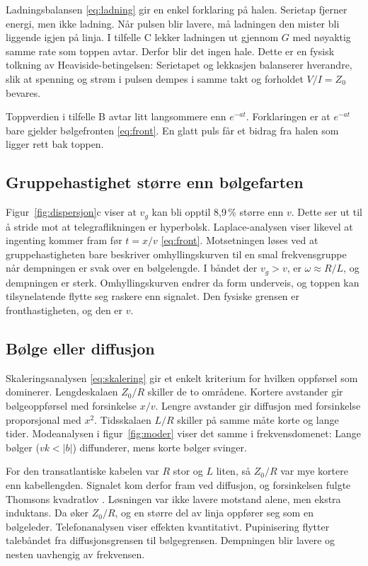 \documentclass[11pt,a4paper]{article}
\numberwithin{equation}{section}
\numberwithin{figure}{section}
\numberwithin{table}{section}
\begin{document}
Ladningsbalansen \eqref{eq:ladning} gir en enkel forklaring på halen. Serietap
fjerner energi, men ikke ladning. Når pulsen blir lavere, må ladningen den mister
bli liggende igjen på linja. I tilfelle C lekker ladningen ut gjennom $G$ med
nøyaktig samme rate som toppen avtar. Derfor blir det ingen hale. Dette er en
fysisk tolkning av Heaviside-betingelsen: Serietapet og lekkasjen balanserer
hverandre, slik at spenning og strøm i pulsen dempes i samme takt og forholdet
$V/I = Z_0$ bevares.

Toppverdien i tilfelle B avtar litt langsommere enn $e^{-at}$. Forklaringen er
at $e^{-at}$ bare gjelder bølgefronten \eqref{eq:front}. En glatt puls får et
bidrag fra halen som ligger rett bak toppen.

\subsection{Gruppehastighet større enn bølgefarten}
Figur~\ref{fig:dispersjon}c viser at $v_g$ kan bli opptil 8,9\,\% større enn $v$.
Dette ser ut til å stride mot at telegraflikningen er hyperbolsk. Laplace-analysen
viser likevel at ingenting kommer fram før $t = x/v$ \eqref{eq:front}.
Motsetningen løses ved at gruppehastigheten bare beskriver omhyllingskurven til
en smal frekvensgruppe når dempningen er svak over en bølgelengde. I båndet der
$v_g > v$, er $\omega \approx R/L$, og dempningen er sterk. Omhyllingskurven
endrer da form underveis, og toppen kan tilsynelatende flytte seg raskere enn
signalet. Den fysiske grensen er fronthastigheten, og den er $v$.

\subsection{Bølge eller diffusjon}
Skaleringsanalysen \eqref{eq:skalering} gir et enkelt kriterium for hvilken
oppførsel som dominerer. Lengdeskalaen $Z_0/R$ skiller de to områdene. Kortere
avstander gir bølgeoppførsel med forsinkelse $x/v$. Lengre avstander gir diffusjon
med forsinkelse proporsjonal med $x^2$. Tidsskalaen $L/R$ skiller på samme måte
korte og lange tider. Modeanalysen i figur~\ref{fig:moder} viser det samme i
frekvensdomenet: Lange bølger ($vk < |b|$) diffunderer, mens korte bølger svinger.

For den transatlantiske kabelen var $R$ stor og $L$ liten, så $Z_0/R$ var mye
kortere enn kabellengden. Signalet kom derfor fram ved diffusjon, og
forsinkelsen fulgte Thomsons kvadratlov \cite{thomson1855}. Løsningen var ikke
lavere motstand alene, men ekstra induktans. Da øker $Z_0/R$, og en større del
av linja oppfører seg som en bølgeleder. Telefonanalysen viser effekten
kvantitativt. Pupinisering flytter talebåndet fra diffusjonsgrensen til
bølgegrensen. Dempningen blir lavere og nesten uavhengig av frekvensen.
\end{document}
